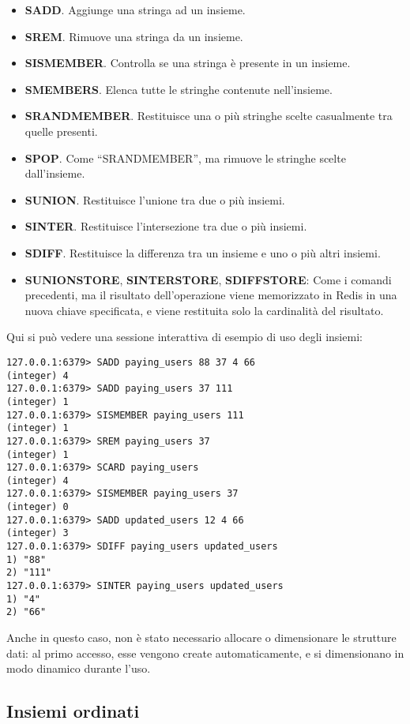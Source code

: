 \begin{itemize}
	\medskip
	\item \textbf{SADD}. Aggiunge una stringa ad un insieme.
	\item \textbf{SREM}. Rimuove una stringa da un insieme.
	\item \textbf{SISMEMBER}. Controlla se una stringa è presente in un insieme.
	\item \textbf{SMEMBERS}. Elenca tutte le stringhe contenute nell'insieme.
	\item \textbf{SRANDMEMBER}. Restituisce una o più stringhe scelte casualmente tra quelle
	presenti.
	\item \textbf{SPOP}. Come ``SRANDMEMBER'', ma rimuove le stringhe scelte dall'insieme.
	\item \textbf{SUNION}. Restituisce l'unione tra due o più insiemi.
	\item \textbf{SINTER}. Restituisce l'intersezione tra due o più insiemi.
	\item \textbf{SDIFF}. Restituisce la differenza tra un insieme e uno o più altri insiemi.
	\item \textbf{SUNIONSTORE}, \textbf{SINTERSTORE}, \textbf{SDIFFSTORE}: Come i comandi
	precedenti, ma il risultato dell'operazione viene memorizzato in Redis in una nuova chiave
	specificata, e viene restituita solo la cardinalità del risultato.
\end{itemize}

Qui si può vedere una sessione interattiva di esempio di uso degli insiemi:

\medskip
\begin{lstlisting}
127.0.0.1:6379> SADD paying_users 88 37 4 66
(integer) 4
127.0.0.1:6379> SADD paying_users 37 111
(integer) 1
127.0.0.1:6379> SISMEMBER paying_users 111
(integer) 1
127.0.0.1:6379> SREM paying_users 37
(integer) 1
127.0.0.1:6379> SCARD paying_users
(integer) 4
127.0.0.1:6379> SISMEMBER paying_users 37
(integer) 0
127.0.0.1:6379> SADD updated_users 12 4 66
(integer) 3
127.0.0.1:6379> SDIFF paying_users updated_users
1) "88"
2) "111"
127.0.0.1:6379> SINTER paying_users updated_users
1) "4"
2) "66"
\end{lstlisting}

Anche in questo caso, non è stato necessario allocare o dimensionare le strutture dati: al primo
accesso, esse vengono create automaticamente, e si dimensionano in modo dinamico durante l'uso.

\subsection{Insiemi ordinati}

